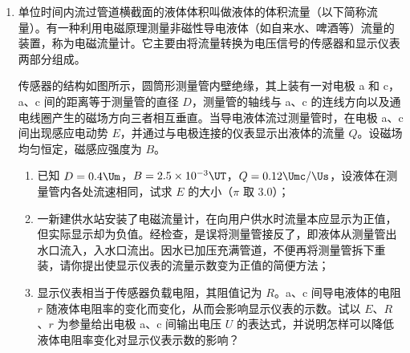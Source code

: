 \documentclass[\gkver]{gaokaozhenti}
\begin{document}
\begin{enumerate}
\begin{enumerate}
	\item
	推导第一宇宙速度 $v_{1}$ 的表达式；
	\item
	若卫星绕地球做匀速圆周运动，运行轨道距地面高度为 $h$，求卫星的运行周期 $T$。
\end{enumerate}



\item
单位时间内流过管道横截面的液体体积叫做液体的体积流量（以下简称流量）。有一种利用电磁原理测量非磁性导电液体（如自来水、啤酒等）流量的装置，称为电磁流量计。它主要由将流量转换为电压信号的传感器和显示仪表两部分组成。

传感器的结构如图所示，圆筒形测量管内壁绝缘，其上装有一对电极 a 和 c，a、c 间的距离等于测量管的直径 $D$，测量管的轴线与 a、c 的连线方向以及通电线圈产生的磁场方向三者相互垂直。当导电液体流过测量管时，在电极 a、c 间出现感应电动势 $E$，并通过与电极连接的仪表显示出液体的流量 $Q$。设磁场均匀恒定，磁感应强度为 $B$。

\begin{enumerate}
	\item
	已知 $D=0.4\Um$，$B=2.5\times10^{-3}\UT$，$Q=0.12\Umc/\Us$，设液体在测量管内各处流速相同，试求 $E$ 的大小（$\pi$ 取 3.0）；
	\item
	一新建供水站安装了电磁流量计，在向用户供水时流量本应显示为正值，但实际显示却为负值。经检查，是误将测量管接反了，即液体从测量管出水口流入，入水口流出。因水已加压充满管道，不便再将测量管拆下重装，请你提出使显示仪表的流量示数变为正值的简便方法；
	\item
	显示仪表相当于传感器负载电阻，其阻值记为 $R$。a、c 间导电液体的电阻 $r$ 随液体电阻率的变化而变化，从而会影响显示仪表的示数。试以 $E$、$R$、$r$ 为参量给出电极 a、c 间输出电压 $U$ 的表达式，并说明怎样可以降低液体电阻率变化对显示仪表示数的影响？
\end{enumerate}


\end{enumerate}
\end{document}
